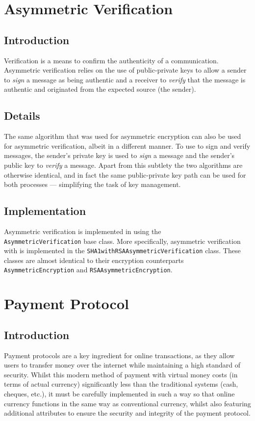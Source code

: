 \documentclass[a4paper,11pt]{article}
\begin{document}
\section{Asymmetric Verification}

\subsection{Introduction}
Verification is a means to confirm the authenticity of a communication.
Asymmetric verification relies on the use of public-private keys to allow a
sender to \emph{sign} a message as being authentic and a receiver to
\emph{verify} that the message is authentic and originated from the expected
source (the sender).

\subsection{Details}
The same  algorithm that was used for asymmetric encryption can
also be used for asymmetric verification, albeit in a different manner. To use
 to sign and verify messages, the sender's private key is used
to \emph{sign} a message and the sender's public key to \emph{verify} a message.
Apart from this subtlety the two algorithms are otherwise identical, and in fact
the same public-private key path can be used for both processes --- simplifying
the task of key management.

\subsection{Implementation}
Asymmetric verification is implemented in \packageName{} using the \\
\verb+AsymmetricVerification+ base class. More specifically, asymmetric
verification with  is implemented in the
\verb+SHA1withRSAAsymmetricVerification+ class. These classes are almost
identical to their encryption counterparts \verb+AsymmetricEncryption+ and
\verb+RSAAsymmetricEncryption+.

\section{Payment Protocol}

\subsection{Introduction}
Payment protocols are a key ingredient for online transactions, as they allow
users to transfer money over the internet while maintaining a high standard of
security. Whilst this modern method of payment with virtual money costs (in
terms of actual currency) significantly less than the traditional systems (cash,
cheques, etc.), it must be carefully implemented in such a way so that online
currency functions in the same way as conventional currency, whilst also
featuring additional attributes to ensure the security and integrity of the
payment protocol.
\end{document}
